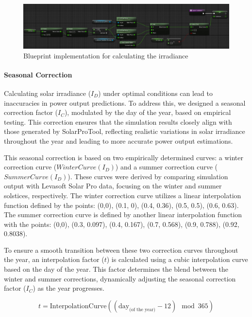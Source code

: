 \documentclass[draft, final]{vutinfth} %
\begin{document}
\begin{figure}
    \centering
    \includegraphics[width=\textwidth]{graphics/irradiance-bp.jpg}
    \caption{Blueprint implementation for calculating the irradiance}
    \label{fig:airmass-bp}
\end{figure}

\paragraph{Seasonal Correction}

Calculating solar irradiance ($I_D$) under optimal conditions can lead to inaccuracies in power output predictions. To address this, we designed a seasonal correction factor ($I_C$), modulated by the day of the year, based on empirical testing. This correction ensures that the simulation results closely align with those generated by SolarProTool, reflecting realistic variations in solar irradiance throughout the year and leading to more accurate power output estimations.

This seasonal correction is based on two empirically determined curves: a winter correction curve ($WinterCurve(I_D)$) and a summer correction curve ($SummerCurve(I_D)$). These curves were derived by comparing simulation output with Levasoft Solar Pro data, focusing on the winter and summer solstices, respectively. The winter correction curve utilizes a linear interpolation function defined by the points: (0,0), (0.1, 0), (0.4, 0.36), (0.5, 0.5), (0.6, 0.63). The summer correction curve is defined by another linear interpolation function with the points: (0,0), (0.3, 0.097), (0.4, 0.167), (0.7, 0.568), (0.9, 0.788), (0.92, 0.8038).

To ensure a smooth transition between these two correction curves throughout the year, an interpolation factor ($t$) is calculated using a cubic interpolation curve based on the day of the year. This factor determines the blend between the winter and summer corrections, dynamically adjusting the seasonal correction factor ($I_C$) as the year progresses.

\begin{equation} \label{eq:interpolation_factor}
t = \text{InterpolationCurve}\left(\left(\text{day}_{\text{(of the year)}} - 12\right) \mod 365\right)
\end{equation}
\end{document}
